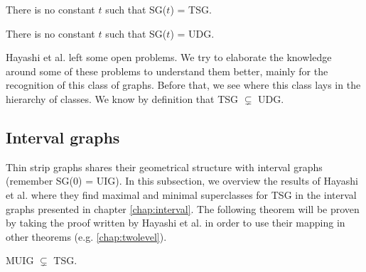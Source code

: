 \begin{theorem}
  There is no constant $t$ such that SG($t$) = TSG.
\end{theorem}

\begin{theorem}
  There is no constant $t$ such that SG($t$) = UDG.
\end{theorem}

Hayashi et al. left some open problems. We try to elaborate the knowledge around some of these problems
to understand them better, mainly for the recognition of this class of graphs. Before that, we see where this class lays in the hierarchy of classes. We know by definition that TSG $\subsetneq$ UDG.

\subsection{Interval graphs}

Thin strip graphs shares their geometrical structure with interval graphs (remember SG($0$) = UIG). In this subsection, we overview the results of Hayashi et al. \cite{hayashiThinStripGraphs2017} where they find maximal and minimal superclasses for TSG in the interval graphs presented in chapter \ref{chap:interval}. The following theorem will be proven by taking the proof written by Hayashi et al. in order to use their mapping in other theorems (e.g. \ref{chap:twolevel}).

\begin{theorem}
  \label{theo:muigTSG}
  MUIG $\subsetneq$ TSG.
\end{theorem}

